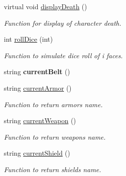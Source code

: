 \begin{DoxyCompactItemize}
\hypertarget{class_characters_a021d59a971cf527cb15a3978faa19c63}{}\label{class_characters_a021d59a971cf527cb15a3978faa19c63} 
virtual void \hyperlink{class_characters_a021d59a971cf527cb15a3978faa19c63}{display\+Death} ()
\begin{DoxyCompactList}\small\item\em Function for display of character death. \end{DoxyCompactList}\item 
\hypertarget{class_characters_afa9c56654b160d186ce3fd8259f8f180}{}\label{class_characters_afa9c56654b160d186ce3fd8259f8f180} 
int \hyperlink{class_characters_afa9c56654b160d186ce3fd8259f8f180}{roll\+Dice} (int)
\begin{DoxyCompactList}\small\item\em Function to simulate dice roll of i faces. \end{DoxyCompactList}\item 
\hypertarget{class_characters_ad39fbd976f089a631abc4a7c24de38d6}{}\label{class_characters_ad39fbd976f089a631abc4a7c24de38d6} 
string {\bfseries current\+Belt} ()
\item 
\hypertarget{class_characters_ab2ff7cf1e6a50e005396ac7ff29c6dad}{}\label{class_characters_ab2ff7cf1e6a50e005396ac7ff29c6dad} 
string \hyperlink{class_characters_ab2ff7cf1e6a50e005396ac7ff29c6dad}{current\+Armor} ()
\begin{DoxyCompactList}\small\item\em Function to return armor\textquotesingle{}s name. \end{DoxyCompactList}\item 
\hypertarget{class_characters_adf56654d23486d7779a006a0b5ed156e}{}\label{class_characters_adf56654d23486d7779a006a0b5ed156e} 
string \hyperlink{class_characters_adf56654d23486d7779a006a0b5ed156e}{current\+Weapon} ()
\begin{DoxyCompactList}\small\item\em Function to return weapon\textquotesingle{}s name. \end{DoxyCompactList}\item 
\hypertarget{class_characters_a1e4c32972619f14dbeae485316f77a5d}{}\label{class_characters_a1e4c32972619f14dbeae485316f77a5d} 
string \hyperlink{class_characters_a1e4c32972619f14dbeae485316f77a5d}{current\+Shield} ()
\begin{DoxyCompactList}\small\item\em Function to return shield\textquotesingle{}s name. \end{DoxyCompactList}\item 

\end{DoxyCompactItemize}

